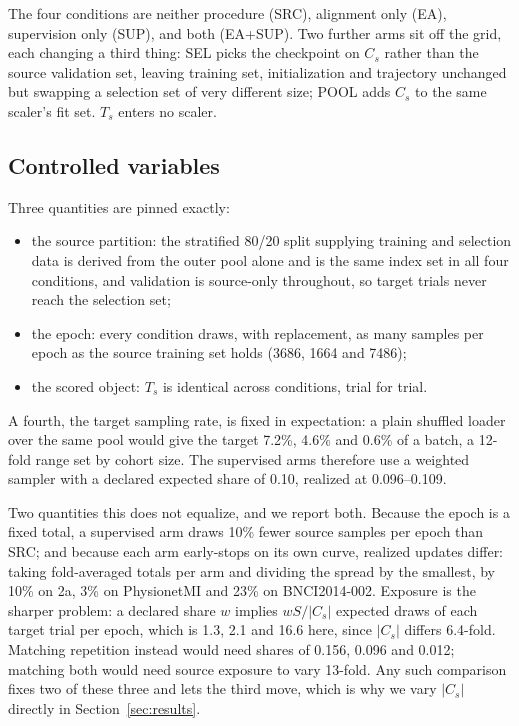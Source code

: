 The four conditions are neither procedure (SRC), alignment only (EA), supervision only (SUP), and both (EA+SUP). Two further arms sit off the grid, each changing a third thing: SEL picks the checkpoint on $C_s$ rather than the source validation set, leaving training set, initialization and trajectory unchanged but swapping a selection set of very different size; POOL adds $C_s$ to the same scaler's fit set. $T_s$ enters no scaler.



\subsection{Controlled variables}
\label{sec:controls}
Three quantities are pinned exactly:
\begin{itemize}[nosep,leftmargin=1.2em]
\item the source partition: the stratified 80/20 split supplying training and selection data is derived from the outer pool alone and is the same index set in all four conditions, and validation is source-only throughout, so target trials never reach the selection set;
\item the epoch: every condition draws, with replacement, as many samples per epoch as the source training set holds (3686, 1664 and 7486);
\item the scored object: $T_s$ is identical across conditions, trial for trial.
\end{itemize}
A fourth, the target sampling rate, is fixed in expectation: a plain shuffled loader over the same pool would give the target 7.2\%, 4.6\% and 0.6\% of a batch, a 12-fold range set by cohort size. The supervised arms therefore use a weighted sampler with a declared expected share of 0.10, realized at 0.096--0.109.

Two quantities this does not equalize, and we report both. Because the epoch is a fixed total, a supervised arm draws 10\% fewer source samples per epoch than SRC; and because each arm early-stops on its own curve, realized updates differ: taking fold-averaged totals per arm and dividing the spread by the smallest, by 10\% on 2a, 3\% on PhysionetMI and 23\% on BNCI2014-002. Exposure is the sharper problem: a declared share $w$ implies $wS/|C_s|$ expected draws of each target trial per epoch, which is 1.3, 2.1 and 16.6 here, since $|C_s|$ differs 6.4-fold. Matching repetition instead would need shares of 0.156, 0.096 and 0.012; matching both would need source exposure to vary 13-fold. Any such comparison fixes two of these three and lets the third move, which is why we vary $|C_s|$ directly in Section~\ref{sec:results}.

